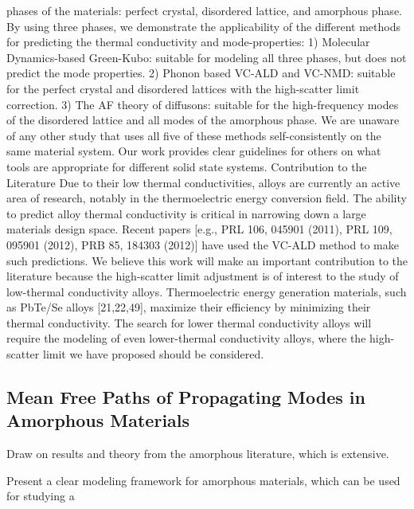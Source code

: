 phases of the materials: perfect crystal, disordered lattice, and 
amorphous phase. By using three phases, we demonstrate the applicability 
of the different methods for predicting the thermal conductivity and 
mode-properties:
1) Molecular Dynamics-based Green-Kubo: suitable for modeling all 
three phases, but does not predict the mode properties.
2) Phonon based VC-ALD and VC-NMD: suitable for the perfect crystal 
and disordered lattices with the high-scatter limit correction.
3) The AF theory of diffusons: suitable for the high-frequency modes 
of the disordered lattice and all modes of the amorphous phase. 
We are unaware of any other study that uses all five of these methods 
self-consistently on the same material system. Our work provides clear 
guidelines for others on what tools are appropriate for different 
solid state systems.
Contribution to the Literature
Due to their low thermal conductivities, alloys are currently an active 
area of research, notably in the thermoelectric energy conversion field. 
The ability to predict alloy thermal conductivity is critical in 
narrowing down a large materials design space. Recent papers 
[e.g., PRL 106, 045901 (2011), PRL 109, 095901 (2012), 
PRB 85, 184303 (2012)] have used the VC-ALD method to make such 
predictions.
We believe this work will make an important contribution to the 
literature because the high-scatter limit adjustment is of interest 
to the study of low-thermal conductivity alloys. Thermoelectric energy 
generation materials, such as PbTe/Se alloys [21,22,49], maximize their 
efficiency by minimizing their thermal conductivity. The search for 
lower thermal conductivity alloys will require the modeling of even 
lower-thermal conductivity alloys, where the high-scatter limit we 
have proposed should be considered.


\subsection{Mean Free Paths of Propagating Modes in Amorphous 
Materials}

Draw on results and theory from the amorphous literature, which 
is extensive. 

Present a clear modeling framework for amorphous materials, which 
can be used for studying a 

